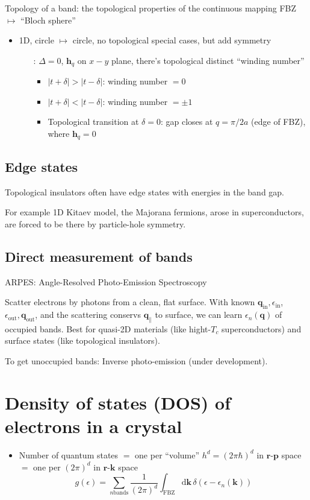\documentclass[11pt,letterpaper]{article}
\numberwithin{equation}{section} %
\renewcommand*{\vec}[1]{\bm{#1}}
\newcommand{\dif}{\mathrm d}
\begin{document}
Topology of a band: the topological properties of the continuous mapping FBZ
$\mapsto$ ``Bloch sphere''
\begin{itemize}
  \item 1D, circle $\mapsto$ circle, no topological special cases, but add
	  symmetry
	  \begin{itemize}
		  \item[:] $\Delta=0$, $\vec h_q$ on $x-y$ plane, there's topological
			distinct ``winding number''
			\begin{itemize}
			  \item $|t+\delta|>|t-\delta|$: winding number $=0$
			  \item $|t+\delta|<|t-\delta|$: winding number $=\pm 1$
			  \item Topological transition at $\delta=0$: gap closes at
				  $q=\pi/2a$ (edge of FBZ), where $\vec h_q = 0$
			\end{itemize}
	  \end{itemize}
\end{itemize}

\subsection{Edge states}
\label{sub:edge_states}
Topological insulators often have edge states with energies in the band gap.

For example 1D Kitaev model, the Majorana fermions, arose in superconductors,
are forced to be there by particle-hole symmetry.

\subsection{Direct measurement of bands}
\label{sub:direct_measurement_of_bans}
ARPES: Angle-Resolved Photo-Emission Spectroscopy

Scatter electrons by photons from a clean, flat surface. With known $\vec
q_{\mathrm{in}}, \epsilon_{\mathrm{in}}$, $\epsilon_{\mathrm{out}}, 
\vec q_{\mathrm{out}}$, and the scattering conservs $\vec q_\parallel$ to
surface, we can learn $\epsilon_n(\vec q)$ of occupied bands. Best for
quasi-2D materials (like hight-$T_c$ superconductors) and surface states
(like topological insulators).

To get unoccupied bands: Inverse photo-emission (under development).

\section{Density of states (DOS) of electrons in a crystal}
\label{sec:density_of_states_dos_of_electrons_in_a_crystal}
\begin{itemize}
	\item Number of quantum states $=$ one per ``volume'' $h^d =
		(2\pi\hbar)^d$ in $\vec r$-$\vec p$ space $=$ one per $(2\pi)^d$ in
		$\vec r$-$\vec k$ space
		\begin{equation}
			g(\epsilon) = \sum_{n\mbox{bands}} \frac{1}{(2\pi)^d}
			\int_{\mbox{FBZ}}\dif\vec k\,\delta(\epsilon - \epsilon_n(\vec
			k))
		\end{equation}
\end{itemize}
\end{document}
